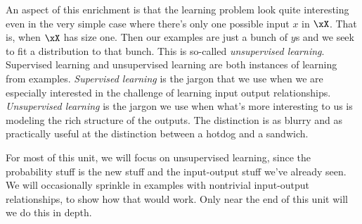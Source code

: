 An aspect of this enrichment is that the learning problem look quite
interesting even in the very simple case where there's only one possible input
$x$ in $\xX$.  That is, when $\xX$ has size one.  Then our examples are just a
bunch of $y$s and we seek to fit a distribution to that bunch.  This is
so-called \emph{unsupervised learning}.  Supervised learning and unsupervised
learning are both instances of learning from examples.  \emph{Supervised
learning} is the jargon that we use when we are especially interested in the
challenge of learning input output relationships.  \emph{Unsupervised learning}
is the jargon we use when what's more interesting to us is modeling the rich
structure of the outputs.  The distinction is as blurry and as practically
useful at the distinction between a hotdog and a sandwich.

For most of this unit, we will focus on unsupervised learning, since the probability
stuff is the new stuff and the input-output stuff we've already seen.  We will
occasionally sprinkle in examples with nontrivial input-output relationships,
to show how that would work.  Only near the end of this unit will we do this
in depth.


